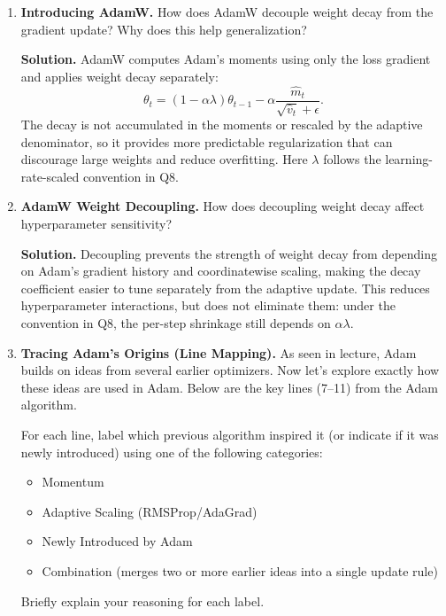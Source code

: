 \documentclass[11pt]{article}
\begin{document}
\begin{enumerate}[label=\textbf{Q\arabic*.}, leftmargin=2.2em, resume]
  \item \textbf{Introducing AdamW.} How does AdamW decouple weight decay from the gradient update? Why does this help generalization?
  \par\smallskip
\textbf{Solution.} AdamW computes Adam's moments using only the loss gradient and applies
weight decay separately:
\[
\theta_t=(1-\alpha\lambda)\theta_{t-1}
-\alpha\frac{\hat m_t}{\sqrt{\hat v_t}+\epsilon}.
\]
The decay is not accumulated in the moments or rescaled by the adaptive denominator,
so it provides more predictable regularization that can discourage large weights and reduce overfitting.
Here $\lambda$ follows the learning-rate-scaled convention in Q8.


  \item \textbf{AdamW Weight Decoupling.} How does decoupling weight decay affect hyperparameter sensitivity?
  \par\smallskip
\textbf{Solution.} Decoupling prevents the strength of weight decay from depending on
Adam's gradient history and coordinatewise scaling, making the decay coefficient
easier to tune separately from the adaptive update.
This reduces hyperparameter interactions, but does not eliminate them: under
the convention in Q8, the per-step shrinkage still depends on $\alpha\lambda$.


  \item \textbf{Tracing Adam’s Origins (Line Mapping).}   
    As seen in lecture, Adam builds on ideas from several earlier optimizers. Now let's explore exactly how these ideas are used in Adam. Below are the key lines (7–11) from the Adam algorithm.  
    
    For each line, label which previous algorithm inspired it (or indicate if it was newly introduced) using one of the following categories:
    \begin{itemize}
        \item Momentum
        \item Adaptive Scaling (RMSProp/AdaGrad)
        \item Newly Introduced by Adam
        \item Combination (merges two or more earlier ideas into a single update rule)
    \end{itemize}

    Briefly explain your reasoning for each label.


\end{enumerate}
\end{document}
